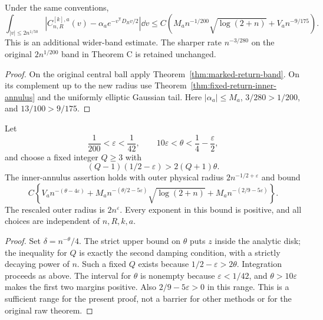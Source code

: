 \begin{corollary}
\label{cor:fixed-count-expanded-band}
Under the same conventions,
\begin{equation}\label{eq:fixed-count-expanded-band}
 \int_{|v|\le2n^{1/50}}
 \left|C^{[k],a}_{n,R}(v)-\alpha_a e^{-v^{\mathsf T}D_Rv/2}\right|\dd v
 \le C\left(M_an^{-1/200}\sqrt{\log(2+n)}+V_an^{-9/175}\right).
\end{equation}
This is an additional wider-band estimate. The sharper rate
$n^{-3/280}$ on the original $2n^{1/200}$ band in Theorem C is
retained unchanged.
\end{corollary}
\begin{proof}
On the original central ball apply
Theorem~\ref{thm:marked-return-band}. On its complement up to the new
radius use Theorem~\ref{thm:fixed-return-inner-annulus} and the
uniformly elliptic Gaussian tail. Here $|\alpha_a|\le M_a$,
$3/280>1/200$, and $13/100>9/175$.
\end{proof}

\begin{proposition}
\label{prop:finite-order-band-range}
Let
\[
 \frac1{200}<\varepsilon<\frac1{42},\qquad
 10\varepsilon<\theta<\frac14-\frac\varepsilon2,
\]
and choose a fixed integer $Q\ge3$ with
\[
 (Q-1)(1/2-\varepsilon)>2(Q+1)\theta.
\]
The inner-annulus assertion holds with outer physical radius
$2n^{-1/2+\varepsilon}$ and bound
\begin{equation}\label{eq:general-fixed-inner-annulus}
 C\left\{V_a n^{-(\theta-4\varepsilon)}
    +M_a n^{-(\theta/2-5\varepsilon)}\sqrt{\log(2+n)}
    +M_a n^{-(2/9-5\varepsilon)}\right\}.
\end{equation}
The rescaled outer radius is $2n^\varepsilon$. Every exponent in this
bound is positive, and all choices are independent of $n,R,k,a$.
\end{proposition}
\begin{proof}
Set $\delta=n^{-\theta}/4$. The strict upper bound on $\theta$
puts $z$ inside the analytic disk; the inequality for $Q$ is exactly
the second damping condition, with a strictly decaying power of $n$.
Such a fixed $Q$ exists because $1/2-\varepsilon>2\theta$.
Integration proceeds as above. The interval for $\theta$ is nonempty
because $\varepsilon<1/42$, and $\theta>10\varepsilon$ makes the
first two margins positive. Also $2/9-5\varepsilon>0$ in this range.
This is a sufficient range for the present proof, not a barrier for
other methods or for the original raw theorem.
\end{proof}

